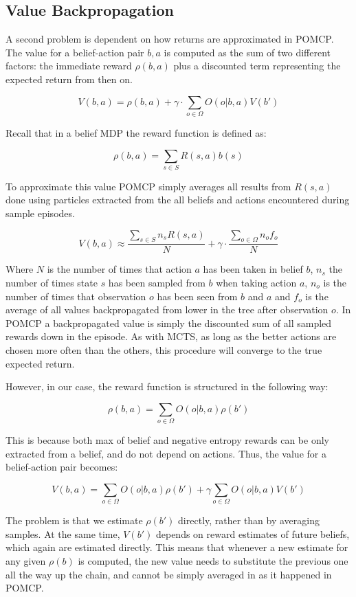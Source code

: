 \subsection{Value Backpropagation}

A second problem is dependent on how returns are approximated in POMCP. The value for a
belief-action pair $b,a$ is computed as the sum of two different factors: the immediate reward
$\rho(b,a)$ plus a discounted term representing the expected return from then on.

\[ V(b,a) = \rho(b,a) + \gamma \cdot \sum_{o\in \Omega} O(o|b,a) V(b') \]

Recall that in a belief MDP the reward function is defined as:

\[ \rho(b,a) = \sum_{s\in S} R(s,a) b(s) \]

To approximate this value POMCP simply averages all results from $R(s,a)$ done using particles
extracted from the all beliefs and actions encountered during sample episodes.

\[ V(b,a) \approx \frac{\sum_{s \in S} n_s R(s,a)}{N} + \gamma \cdot \frac{\sum_{o\in \Omega} n_o f_o}{N} \]

Where $N$ is the number of times that action $a$ has been taken in belief $b$, $n_s$ the number of
times state $s$ has been sampled from $b$ when taking action $a$, $n_o$ is the number of times that
observation $o$ has been seen from $b$ and $a$ and $f_o$ is the average of all values backpropagated
from lower in the tree after observation $o$. In POMCP a backpropagated value is simply the
discounted sum of all sampled rewards down in the episode. As with MCTS, as long as the better
actions are chosen more often than the others, this procedure will converge to the true expected
return.

However, in our case, the reward function is structured in the following way:

\[ \rho(b,a) = \sum_{o\in \Omega} O(o | b, a) \rho(b') \]

This is because both max of belief and negative entropy rewards can be only extracted from a belief,
and do not depend on actions. Thus, the value for a belief-action pair becomes:

\[ V(b,a) = \sum_{o\in \Omega} O(o | b,a) \rho(b') + \gamma\sum_{o\in\Omega} O(o|b,a) V(b') \]

The problem is that we estimate $\rho(b')$ directly, rather than by averaging samples. At the same
time, $V(b')$ depends on reward estimates of future beliefs, which again are estimated directly.
This means that whenever a new estimate for any given $\rho(b)$ is computed, the new value needs to
substitute the previous one all the way up the chain, and cannot be simply averaged in as it
happened in POMCP.

